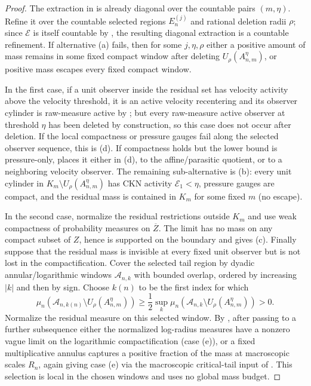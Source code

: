 \documentclass[11pt]{amsart}
\numberwithin{equation}{section}
\theoremstyle{plain}
\theoremstyle{definition}
\theoremstyle{remark}
\newcommand{\calE}{\mathcal E}
\begin{document}
\begin{proof}
The extraction in  is already diagonal over the
countable pairs \((m,\eta)\).  Refine it over the countable selected regions
\(E_n^{(j)}\) and rational deletion radii \(\rho\); since \(\mathcal E\) is
itself countable by , the resulting
diagonal extraction is a countable refinement.  If alternative
\textup{(a)} fails, then for some \(j,\eta,\rho\) either a positive amount of
mass remains in some fixed compact window after deleting
\(U_\rho(A_{n,m}^{\eta})\), or positive mass escapes every fixed compact
window.

In the first case, if a unit observer inside the residual set has velocity
activity above the velocity threshold, it is an active velocity recentering and
its observer cylinder is raw-measure active by
; but every raw-measure active
observer at threshold \(\eta\) has been deleted by construction, so this case
does not occur after deletion.  If the local compactness or pressure gauges
fail along the selected observer sequence, this is \textup{(d)}.  If
compactness holds but the lower bound is pressure-only,
 places it either in \textup{(d)},
to the affine/parasitic quotient, or to a neighboring velocity observer.  The
remaining sub-alternative is \textup{(b)}: every unit cylinder in
\(K_m\setminus U_\rho(A_{n,m}^{\eta})\) has CKN activity \(\calE_1<\eta\),
pressure gauges are compact, and the residual mass is contained in
\(K_m\) for some fixed \(m\) (no escape).

In the second case, normalize the residual restrictions outside \(K_m\) and use
weak compactness of probability measures on \(\overline Z\).  The limit has no
mass on any compact subset of \(Z\), hence is supported on the boundary and gives
\textup{(c)}.  Finally suppose that the residual mass is invisible at every
fixed unit observer but is not lost in the compactification.  Cover the selected
tail region by dyadic annular/logarithmic windows \(\mathcal A_{n,k}\) with
bounded overlap, ordered by increasing \(|k|\) and then by sign.  Choose
\(k(n)\) to be the first index for which
\[
   \mu_n\!\left(\mathcal A_{n,k(n)}
      \setminus U_\rho(A_{n,m}^{\eta})\right)
   \ge \frac12
   \sup_k
   \mu_n\!\left(\mathcal A_{n,k}
      \setminus U_\rho(A_{n,m}^{\eta})\right)>0 .
\]
Normalize the residual measure on this selected window.  By
, after passing to a further
subsequence either the normalized log-radius measures have a nonzero vague
limit on the logarithmic compactification (case \textup{(e)}), or a fixed
multiplicative annulus captures a positive fraction of the mass at macroscopic
scales \(R_n\), again giving case \textup{(e)} via the macroscopic
critical-tail input of .  This
selection is local in the chosen windows and uses no global mass budget.
\end{proof}
\end{document}
